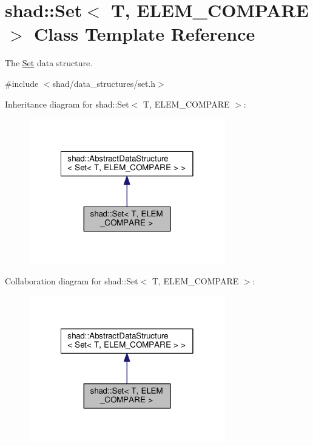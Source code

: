 \hypertarget{classshad_1_1Set}{\section{shad\-:\-:Set$<$ T, E\-L\-E\-M\-\_\-\-C\-O\-M\-P\-A\-R\-E $>$ Class Template Reference}
\label{classshad_1_1Set}
}


The \hyperlink{classshad_1_1Set}{Set} data structure.  




{\ttfamily \#include $<$shad/data\-\_\-structures/set.\-h$>$}



Inheritance diagram for shad\-:\-:Set$<$ T, E\-L\-E\-M\-\_\-\-C\-O\-M\-P\-A\-R\-E $>$\-:
\nopagebreak
\begin{figure}[H]
\begin{center}
\leavevmode
\includegraphics[width=242pt]{classshad_1_1Set__inherit__graph}
\end{center}
\end{figure}


Collaboration diagram for shad\-:\-:Set$<$ T, E\-L\-E\-M\-\_\-\-C\-O\-M\-P\-A\-R\-E $>$\-:
\nopagebreak
\begin{figure}[H]
\begin{center}
\leavevmode
\includegraphics[width=242pt]{classshad_1_1Set__coll__graph}
\end{center}
\end{figure}
